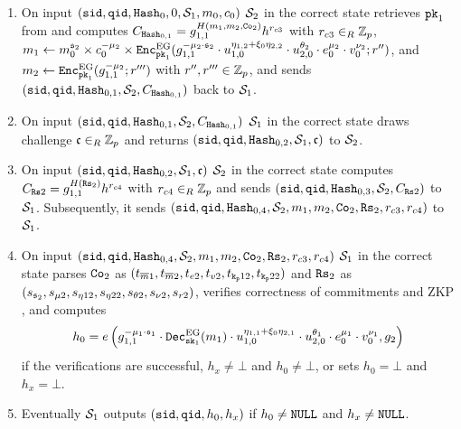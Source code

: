 \begin{enumerate}
	    \item On input $(\mathtt{sid},\mathtt{qid},\mathtt{Hash}_0,0,\mathcal{S}_1,m_0,c_0)$ $\mathcal{S}_2$ in the correct state retrieves $\mathtt{pk}_1$ from \Fca and computes
	      $C_{\mathtt{Hash}_{0,1}}=g_{1,1}^{H(m_{1},m_{2},\mathtt{Co}_2)} h^{r_{c3}}$
	      with $r_{c3}\in_R\mathbb{Z}_p$,
	      $m_{1}\gets m_0^{\share_2} \times c_0^{-\mu_2} \times \Enc_{\pk_1}^\EG(g_{1,1}^{-\mu_2\cdot {\share_2}} \cdot u_{1,0}^{\eta_{1,2}+\xi_0\eta_{2,2}} \cdot u_{2,0}^{\theta_2} \cdot e_0^{\mu_2} \cdot v_0^{\nu_2}; r'')$, and $m_{2}\gets \mathtt{Enc}_{\mathtt{pk}_1}^\mathrm{EG}(g_{1,1}^{-\mu_2}; r''')$ with $r'',r'''\in\mathbb{Z}_p$,
	      and sends $(\mathtt{sid},\mathtt{qid},\mathtt{Hash}_{0,1},\mathcal{S}_2,C_{\mathtt{Hash}_{0,1}})$ back to $\mathcal{S}_1$.
	      
	    \item On input $(\mathtt{sid},\mathtt{qid},\mathtt{Hash}_{0,1},\mathcal{S}_2,C_{\mathtt{Hash}_{0,1}})$ $\mathcal{S}_1$ in the correct state draws challenge $\mathfrak{c}\in_R\mathbb{Z}_p$ and returns $(\mathtt{sid},\mathtt{qid},\mathtt{Hash}_{0,2},\mathcal{S}_1,\mathfrak{c})$ to $\mathcal{S}_2$. 
	    
	    \item On input $(\mathtt{sid},\mathtt{qid},\mathtt{Hash}_{0,2},\mathcal{S}_1,\mathfrak{c})$ $\mathcal{S}_2$ in the correct state computes
	    $C_{\mathtt{Rs}2}=g_{1,1}^{H(\mathtt{Rs}_{2})} h^{r_{c4}}$ with $r_{c4}\in_R\mathbb{Z}_p$
	    and sends $(\mathtt{sid},\mathtt{qid},\mathtt{Hash}_{0,3},\mathcal{S}_2,C_{\mathtt{Rs}2})$ to $\mathcal{S}_1$.
	    Subsequently, it sends $(\mathtt{sid},\mathtt{qid},\mathtt{Hash}_{0,4},\mathcal{S}_2, m_1, m_2, \mathtt{Co}_2, \mathtt{Rs}_2, r_{c3}, r_{c4})$ to $\mathcal{S}_1$.
	    
	    \item On input $(\mathtt{sid},\mathtt{qid},\mathtt{Hash}_{0,4},\mathcal{S}_2, m_1, m_2, \mathtt{Co}_2, \mathtt{Rs}_2, r_{c3}, r_{c4})$ $\mathcal{S}_1$ in the correct state parses $\mathtt{Co}_{2}$ as $(t_{\overline{m}1}, t_{\overline{m}2}, t_{e2}, t_{v2}, t_{\mathtt{k_p}12}, t_{\mathtt{k_p}22})$ and $\mathtt{Rs}_{2}$ as $(s_{\mathfrak{s}_2}, s_{\mu2}, s_{\eta12}, s_{\eta22}, s_{\theta2}, s_{\nu2}, s_{r2})$, verifies correctness of commitments and \ac{ZKP} , and computes
	      \[h_0 = e\left( g_{1,1}^{-\mu_1\cdot \mathfrak{s}_1} \cdot \mathtt{Dec}_{\mathtt{sk}_1}^\mathrm{EG}(m_1) \cdot u_{1,0}^{\eta_{1,1}+\xi_0\eta_{2,1}} \cdot u_{2,0}^{\theta_1} \cdot e_0^{\mu_1} \cdot v_0^{\nu_1}, g_2 \right)\] 
	      if the verifications are successful, $h_x\not=\bot$ and $h_0\not=\bot$, or sets $h_0=\bot$ and $h_x=\bot$.
	    
	    \item Eventually $\mathcal{S}_1$ outputs $(\mathtt{sid}, \mathtt{qid}, h_0, h_x)$ if $h_0\not=\mathtt{NULL}$ and $h_x\not=\mathtt{NULL}$.
	  \end{enumerate}
	  	

